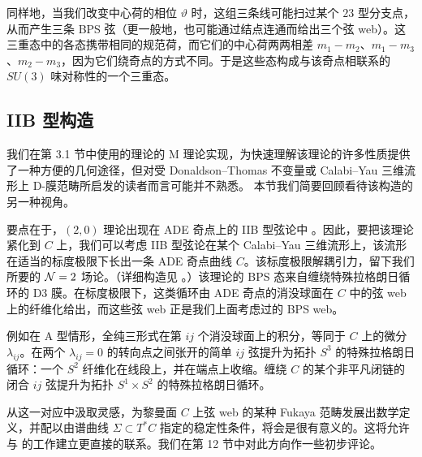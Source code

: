 

同样地，当我们改变中心荷的相位 $\vartheta$ 时，这组三条线可能扫过某个 $23$ 型分支点，从而产生三条 BPS 弦（更一般地，也可能通过结点连通而给出三个弦 web）。这三重态中的各态携带相同的规范荷，而它们的中心荷两两相差 $m_1-m_2$、$m_1-m_3$、$m_2-m_3$，因为它们绕奇点的方式不同。于是这些态构成与该奇点相联系的 $SU(3)$ 味对称性的一个三重态。

\subsection{IIB 型构造}\label{sec:iib}

我们在第 3.1 节中使用的理论的 M 理论实现，为快速理解该理论的许多性质提供了一种方便的几何途径，但对受 Donaldson--Thomas 不变量或 Calabi--Yau 三维流形上 D-膜范畴所启发的读者而言可能并不熟悉。%
本节我们简要回顾看待该构造的另一种视角。

要点在于，$(2,0)$ 理论出现在 ADE 奇点上的 IIB 型弦论中 \cite{Witten:1995zh}。因此，要把该理论紧化到 $C$ 上，我们可以考虑 IIB 型弦论在某个 Calabi--Yau 三维流形上，该流形在适当的标度极限下长出一条 ADE 奇点曲线 $C$。该标度极限解耦引力，留下我们所要的 $\mathcal{N}=2$ 场论。（详细构造见 \cite{Katz:1997eq}。）该理论的 BPS 态来自缠绕特殊拉格朗日循环的 D3 膜。在标度极限下，这类循环由 ADE 奇点的消没球面在 $C$ 中的弦 web 上的纤维化给出，而这些弦 web 正是我们上面考虑过的 BPS web。

例如在 A 型情形，全纯三形式在第 $ij$ 个消没球面上的积分，等同于 $C$ 上的微分 $\lambda_{ij}$。在两个 $\lambda_{ij} = 0$ 的转向点之间张开的简单 $ij$ 弦提升为拓扑 $S^3$ 的特殊拉格朗日循环：一个 $S^2$ 纤维化在线段上，并在端点上收缩。缠绕 $C$ 的某个非平凡闭链的闭合 $ij$ 弦提升为拓扑 $S^1 \times S^2$ 的特殊拉格朗日循环。

从这一对应中汲取灵感，为黎曼面 $C$ 上弦 web 的某种 Fukaya 范畴发展出数学定义，并配以由谱曲线 $\Sigma \subset T^*C$ 指定的稳定性条件，将会是很有意义的。这将允许与 \cite{ks1} 的工作建立更直接的联系。我们在第 12 节中对此方向作一些初步评论。%

